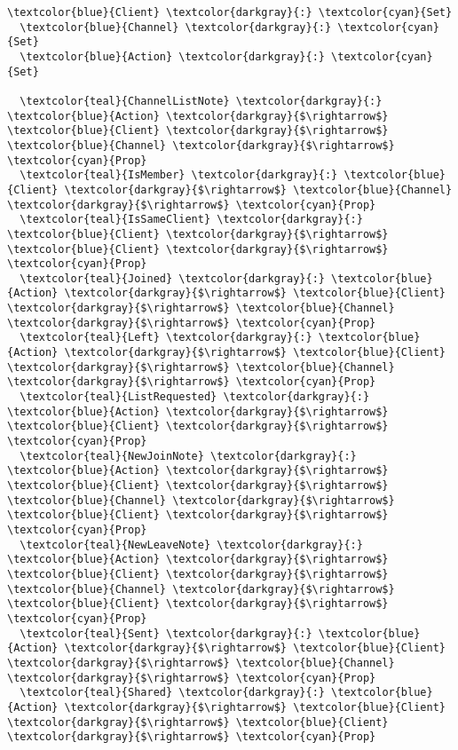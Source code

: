\begin{Verbatim}[commandchars=\\\{\},codes={\catcode`$=3}]
  \textcolor{blue}{Client} \textcolor{darkgray}{:} \textcolor{cyan}{Set}
  \textcolor{blue}{Channel} \textcolor{darkgray}{:} \textcolor{cyan}{Set}
  \textcolor{blue}{Action} \textcolor{darkgray}{:} \textcolor{cyan}{Set}

  \textcolor{teal}{ChannelListNote} \textcolor{darkgray}{:} \textcolor{blue}{Action} \textcolor{darkgray}{$\rightarrow$} \textcolor{blue}{Client} \textcolor{darkgray}{$\rightarrow$} \textcolor{blue}{Channel} \textcolor{darkgray}{$\rightarrow$} \textcolor{cyan}{Prop}
  \textcolor{teal}{IsMember} \textcolor{darkgray}{:} \textcolor{blue}{Client} \textcolor{darkgray}{$\rightarrow$} \textcolor{blue}{Channel} \textcolor{darkgray}{$\rightarrow$} \textcolor{cyan}{Prop}
  \textcolor{teal}{IsSameClient} \textcolor{darkgray}{:} \textcolor{blue}{Client} \textcolor{darkgray}{$\rightarrow$} \textcolor{blue}{Client} \textcolor{darkgray}{$\rightarrow$} \textcolor{cyan}{Prop}
  \textcolor{teal}{Joined} \textcolor{darkgray}{:} \textcolor{blue}{Action} \textcolor{darkgray}{$\rightarrow$} \textcolor{blue}{Client} \textcolor{darkgray}{$\rightarrow$} \textcolor{blue}{Channel} \textcolor{darkgray}{$\rightarrow$} \textcolor{cyan}{Prop}
  \textcolor{teal}{Left} \textcolor{darkgray}{:} \textcolor{blue}{Action} \textcolor{darkgray}{$\rightarrow$} \textcolor{blue}{Client} \textcolor{darkgray}{$\rightarrow$} \textcolor{blue}{Channel} \textcolor{darkgray}{$\rightarrow$} \textcolor{cyan}{Prop}
  \textcolor{teal}{ListRequested} \textcolor{darkgray}{:} \textcolor{blue}{Action} \textcolor{darkgray}{$\rightarrow$} \textcolor{blue}{Client} \textcolor{darkgray}{$\rightarrow$} \textcolor{cyan}{Prop}
  \textcolor{teal}{NewJoinNote} \textcolor{darkgray}{:} \textcolor{blue}{Action} \textcolor{darkgray}{$\rightarrow$} \textcolor{blue}{Client} \textcolor{darkgray}{$\rightarrow$} \textcolor{blue}{Channel} \textcolor{darkgray}{$\rightarrow$} \textcolor{blue}{Client} \textcolor{darkgray}{$\rightarrow$} \textcolor{cyan}{Prop}
  \textcolor{teal}{NewLeaveNote} \textcolor{darkgray}{:} \textcolor{blue}{Action} \textcolor{darkgray}{$\rightarrow$} \textcolor{blue}{Client} \textcolor{darkgray}{$\rightarrow$} \textcolor{blue}{Channel} \textcolor{darkgray}{$\rightarrow$} \textcolor{blue}{Client} \textcolor{darkgray}{$\rightarrow$} \textcolor{cyan}{Prop}
  \textcolor{teal}{Sent} \textcolor{darkgray}{:} \textcolor{blue}{Action} \textcolor{darkgray}{$\rightarrow$} \textcolor{blue}{Client} \textcolor{darkgray}{$\rightarrow$} \textcolor{blue}{Channel} \textcolor{darkgray}{$\rightarrow$} \textcolor{cyan}{Prop}
  \textcolor{teal}{Shared} \textcolor{darkgray}{:} \textcolor{blue}{Action} \textcolor{darkgray}{$\rightarrow$} \textcolor{blue}{Client} \textcolor{darkgray}{$\rightarrow$} \textcolor{blue}{Client} \textcolor{darkgray}{$\rightarrow$} \textcolor{cyan}{Prop}


\end{Verbatim}
